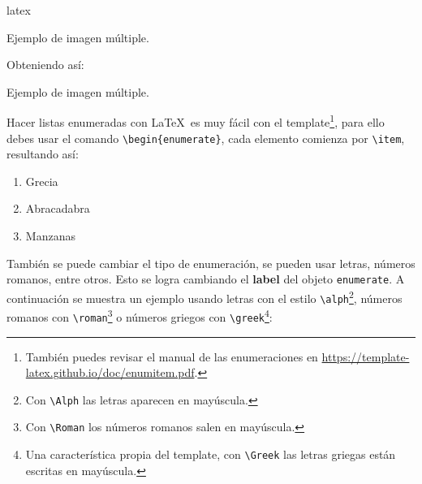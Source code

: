 \begin{sourcecode}{latex}{}
\begin{images}[\label{imagenmultiple}]{Ejemplo de imagen múltiple.}
	\imagesnewline
\end{images}
\end{sourcecode}

	Obteniendo así:

	\begin{images}{Ejemplo de imagen múltiple.}
		\imagesnewline
	\end{images}




	Hacer listas enumeradas con \LaTeX\ es muy fácil con el template\footnote{También puedes revisar el manual de las enumeraciones en \url{https://template-latex.github.io/doc/enumitem.pdf}.}, para ello debes usar el comando \texttt{\textbackslash begin\{enumerate\}}, cada elemento comienza por \texttt{\textbackslash item}, resultando así:

	\begin{enumerate}
		\item Grecia
		\item Abracadabra
		\item Manzanas
	\end{enumerate}

	También se puede cambiar el tipo de enumeración, se pueden usar letras, números romanos, entre otros. Esto se logra cambiando el \textbf{label} del objeto \texttt{enumerate}. A continuación se muestra un ejemplo usando letras con el estilo \texttt{\textbackslash alph}\footnote{Con \texttt{\textbackslash Alph} las letras aparecen en mayúscula.}, números romanos con \texttt{\textbackslash roman}\footnote{Con \texttt{\textbackslash Roman} los números romanos salen en mayúscula.} o números griegos con \texttt{\textbackslash greek}\footnote{Una característica propia del template, con \texttt{\textbackslash Greek} las letras griegas están escritas en mayúscula.}:

